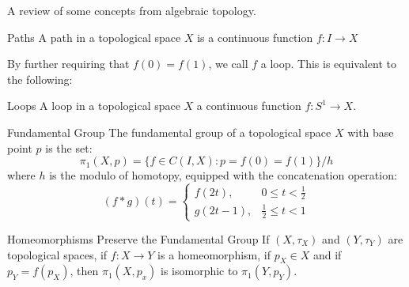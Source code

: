 \documentclass[crop=false,class=book,oneside]{standalone}                      %
\begin{document}
            A review of some concepts from algebraic topology.
            \begin{ldefinition}{Paths}
                A path in a topological space $X$ is a
                continuous function $f:I\rightarrow{X}$
            \end{ldefinition}
            By further requiring that $f(0)=f(1)$, we call $f$ a loop. This is
            equivalent to the following:
            \begin{ldefinition}{Loops}
                A loop in a topological space $X$ a continuous function
                $f:S^{1}\rightarrow{X}$.
            \end{ldefinition}
            \begin{ldefinition}{Fundamental Group}
                The fundamental group of a topological space
                $X$ with base point $p$ is the set:
                \begin{equation}
                    \pi_{1}(X,p)=
                    \{f\in{C(I,X)}:p=f(0)=f(1)\}/h
                \end{equation}
                where $h$ is the modulo of homotopy,
                equipped with the concatenation operation:
                \begin{equation}
                    (f*g)(t)=
                    \begin{cases}
                        f(2t),&0\leq{t}<\frac{1}{2}\\
                        g(2t-1),&\frac{1}{2}\leq{t}<1
                    \end{cases}
                \end{equation}
            \end{ldefinition}
            \begin{ltheorem}{Homeomorphisms Preserve the Fundamental Group}
                If $(X,\tau_{X})$ and $(Y,\tau_{Y})$ are topological spaces,
                if $f:X\rightarrow{Y}$ is a homeomorphism, if $p_{X}\in{X}$ and
                if $p_{Y}=f(p_{X})$, then $\pi_{1}(X,p_{x})$ is isomorphic
                to $\pi_{1}(Y,p_{Y})$.
            \end{ltheorem}
\end{document}
